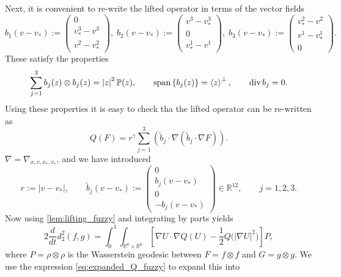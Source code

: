 \documentclass[10pt,oneside]{amsart}
\numberwithin{equation}{section}
\numberwithin{definition}{section}
\numberwithin{theorem}{section}
\numberwithin{lemma}{section}
\begin{document}
%
%
Next, it is convenient to re-write the lifted operator in terms of the vector fields
\begin{equation}\label{eq:defn_bj}
  b_{1}(v-v_*):=\begin{pmatrix}0\\
  v^{3}_*-v^{3}\\
  v^{2}-v_*^{2}
  \end{pmatrix},\; b_{2}(v-v_*):=
  \begin{pmatrix}v^{3}-v_*^{3}\\
  0\\
  v_*^{1}-v^{1}
  \end{pmatrix},\; b_{3}(v-v_*):=\begin{pmatrix}v_*^{2}-v^{2}\\
  v^{1}-v_*^{1}\\
  0
  \end{pmatrix}.
\end{equation}
% 
These satisfy the properties 
%
\begin{equation*}
  \sum_{j=1}^{3}b_{j}(z)\otimes b_{j}(z)=\left|z\right|^{2}\mathbb{P}(z),\qquad\textnormal{span}\left\{ b_{j}(z)\right\} =\left\langle z\right\rangle ^{\perp},\qquad\textnormal{div}\,b_{j}=0.
\end{equation*}
%
Using these properties it is easy to check tha the lifted operator can be re-written as
%
\begin{equation}\label{eq:expanded_Q_fuzzy}
  Q(F)= r^\gamma \sum_{j=1}^3 \left(\tilde b_j \cdot \nabla \left(\tilde b_j \cdot \nabla F\right)\right).
\end{equation}
%
$\nabla=\nabla_{x,v,x_*,v_*}$, and we have introduced 
%
\begin{equation*}
  r := |v-v_*|,\qquad
  \tilde{b}_{j}(v-v_*):=\begin{pmatrix}0\\
  b_{j}(v-v_*)\\
  0\\
  -b_{j}(v-v_*)
  \end{pmatrix}\in\mathbb{R}^{12},\qquad j=1,2,3.
\end{equation*}
% 
Now using \ref{lem:lifting_fuzzy} and integrating by parts yields
%
\begin{equation*}
  2\frac{d}{dt} d_{2}^{2}(f,g) =\int_{0}^{1}\int_{\mathbb R^6\times \mathbb R^6}\left[\nabla U\cdot\nabla Q(U)-\frac{1}{2}Q\big(\left|\nabla U\right|^{2}\big)\right]P,
\end{equation*}
%
where $P=\rho\otimes \rho$ is the Wasserstein geodesic between $F = f\otimes f$ and $G = g\otimes g$. We use the expression \cref{eq:expanded_Q_fuzzy} to expand this into
\end{document}
